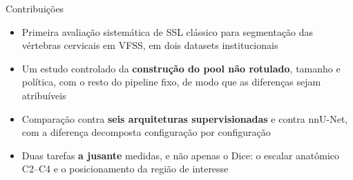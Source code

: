 \documentclass[aspectratio=169]{beamer}
\begin{document}

\begin{frame}{Contribuições}
  \vspace{0.4em}
  \begin{itemize}
    \item Primeira avaliação sistemática de SSL clássico para segmentação das vértebras cervicais em VFSS, em dois datasets institucionais
    \medskip
    \item Um estudo controlado da \textbf{construção do pool não rotulado}, tamanho e política, com o resto do pipeline fixo, de modo que as diferenças sejam atribuíveis
    \medskip
    \item Comparação contra \textbf{seis arquiteturas supervisionadas} e contra nnU-Net, com a diferença decomposta configuração por configuração
    \medskip
    \item Duas tarefas \textbf{a jusante} medidas, e não apenas o Dice: o escalar anatômico C2--C4 e o posicionamento da região de interesse
  \end{itemize}

\end{frame}
\end{document}
